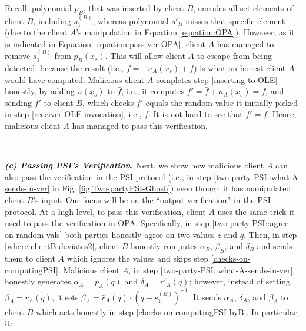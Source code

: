   
 Recall,  polynomial $p_{\scriptscriptstyle B}$, that was inserted by client $B$,  encodes all set elements of client $B$, including $s_{\scriptscriptstyle 1}^{\scriptscriptstyle(B)}$, whereas polynomial $s'_{\scriptscriptstyle B}$ misses that specific element (due to the client $A$'s manipulation in Equation \ref{equation:OPA}). However, as it is indicated in Equation \ref{equation:pass-ver-OPA}, client $A$ has managed  to remove $s_{\scriptscriptstyle 1}^{\scriptscriptstyle(B)}$ from $p_{\scriptscriptstyle B}(x_{\scriptscriptstyle s})$. This will allow client $A$ to escape from being detected, because the result (i.e., $\bar{f}=-u_{\scriptscriptstyle A}(x_{\scriptscriptstyle s})+f$) is what an honest client $A$ would have computed.  Malicious client $A$ completes step \ref{inserting-to-OLE} honestly, by  adding $u(x_{\scriptscriptstyle s})$ to $\bar{f}$, i.e., it computes $f'=\bar{f}+u_{\scriptscriptstyle A}(x_{\scriptscriptstyle s})=f$, and sending $f'$ to client $B$, which checks $f'$ equals the random value it initially picked in step \ref{receiver-OLE-invocation}, i.e., $f$. It is not hard to see that $f'=f$. Hence,  malicious client $A$ has managed to pass this verification. 
   
   
\




  
   \noindent\textit{\textbf{(c) Passing PSI's Verification.}} Next, we show how  malicious client  $A$ can also pass the verification in the PSI protocol (i.e., in step \ref{two-party-PSI::what-A-sends-in-ver} in Fig. \ref{fig:Two-partyPSI-Ghosh}) even though it has manipulated client $B$'s input. Our focus will be on the ``output verification'' in the PSI protocol.   At a high level, to pass this verification, client $A$ uses the same trick it used to pass the verification in OPA. Specifically, in step \ref{two-party-PSI::agree-on-random-vals} both parties honestly agree on two values $z$ and $q$. Then, in step \ref{where-clientB-deviates2}, client $B$ honestly computes $\alpha_{\scriptscriptstyle B}$, $\beta_{\scriptscriptstyle B}$, and $\delta_{\scriptscriptstyle B}$ and sends them to client $A$ which ignores the values and  skips step \ref{checks-on-computingPSI}.  Malicious client $A$, in step \ref{two-party-PSI::what-A-sends-in-ver}, honestly generates $\alpha_{\scriptscriptstyle A}=p_{\scriptscriptstyle A}(q)$ and $\delta_{\scriptscriptstyle A}=r'_{\scriptscriptstyle A}(q)$; however, instead of  setting     $\beta_{\scriptscriptstyle A}=r_{\scriptscriptstyle A}(q)$, it sets     $\beta_{\scriptscriptstyle A}=\bar{r}_{\scriptscriptstyle A}(q)\cdot (q-s^{\scriptscriptstyle(B)}_{\scriptscriptstyle 1})^{\scriptscriptstyle -1}$. It sends $\alpha_{\scriptscriptstyle A}$, $\delta_{\scriptscriptstyle A}$, and $\beta_{\scriptscriptstyle A}$  to client $B$ which acts honestly in step \ref{checks-on-computingPSI-byB}. In particular, it:
   
